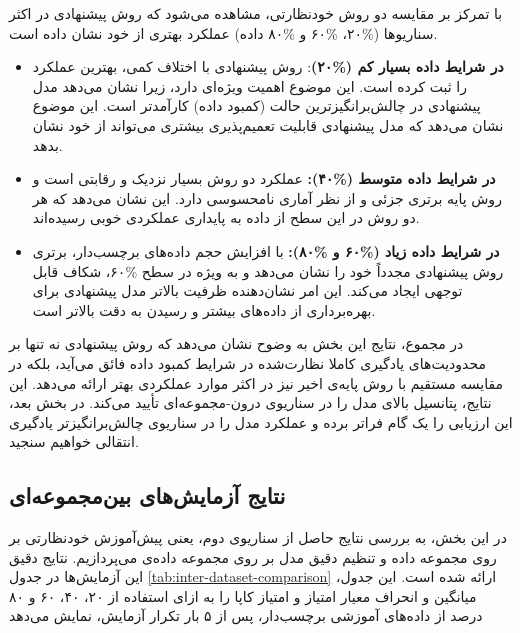 با تمرکز بر مقایسه دو روش خودنظارتی، مشاهده می‌شود که روش پیشنهادی در اکثر سناریوها (\%۲۰، \%۶۰ و \%۸۰ داده) عملکرد بهتری از خود نشان داده است.
\begin{itemize}
    \item \textbf{در شرایط داده بسیار کم (\%۲۰)}: روش پیشنهادی با اختلاف کمی، بهترین عملکرد را ثبت کرده است. این موضوع اهمیت ویژه‌ای دارد، زیرا نشان می‌دهد مدل پیشنهادی در چالش‌برانگیزترین حالت (کمبود داده) کارآمدتر است. این موضوع نشان می‌دهد که مدل پیشنهادی قابلیت تعمیم‌پذیری بیشتری می‌تواند از خود نشان بدهد.
    \item \textbf{در شرایط داده متوسط (\%۴۰):} عملکرد دو روش بسیار نزدیک و رقابتی است و روش پایه برتری جزئی و از نظر آماری نامحسوسی دارد. این نشان می‌دهد که هر دو روش در این سطح از داده به پایداری عملکردی خوبی رسیده‌اند.
    \item \textbf{در شرایط داده زیاد (\%۶۰ و \%۸۰):} با افزایش حجم داده‌های برچسب‌دار، برتری روش پیشنهادی مجدداً خود را نشان می‌دهد و به ویژه در سطح \%۶۰، شکاف قابل توجهی ایجاد می‌کند. این امر نشان‌دهنده ظرفیت بالاتر مدل پیشنهادی برای بهره‌برداری از داده‌های بیشتر و رسیدن به دقت بالاتر است.
\end{itemize}
در مجموع، نتایج این بخش به وضوح نشان می‌دهد که روش پیشنهادی نه تنها بر محدودیت‌های یادگیری کاملا نظارت‌شده در شرایط کمبود داده فائق می‌آید، بلکه در مقایسه مستقیم با روش پایه‌ی اخیر نیز در اکثر موارد عملکردی بهتر ارائه می‌دهد. این نتایج، پتانسیل بالای مدل را در سناریوی درون-مجموعه‌ای تأیید می‌کند. در بخش بعد، این ارزیابی را یک گام فراتر برده و عملکرد مدل را در سناریوی چالش‌برانگیزتر یادگیری انتقالی خواهیم سنجید.

\subsection{نتایج آزمایش‌های بین‌مجموعه‌ای}

در این بخش، به بررسی نتایج حاصل از سناریوی دوم، یعنی پیش‌آموزش خودنظارتی بر روی مجموعه داده  و تنظیم دقیق مدل بر روی مجموعه داده‌ی 
می‌پردازیم. نتایج دقیق این آزمایش‌ها در جدول
\ref{tab:inter-dataset-comparison}
ارائه شده است. این جدول، میانگین و انحراف معیار امتیاز
و امتیاز کاپا را به ازای استفاده از ۲۰، ۴۰، ۶۰ و ۸۰ درصد از داده‌های آموزشی برچسب‌دار، پس از ۵ بار تکرار آزمایش، نمایش می‌دهد

